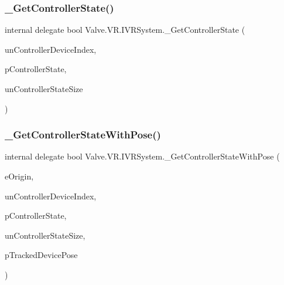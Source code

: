 \mbox{\label{struct_valve_1_1_v_r_1_1_i_v_r_system_a1eca77760e6464488c6ca3e083e0a456}} 
\subsubsection{\texorpdfstring{\_GetControllerState()}{\_GetControllerState()}}
{\footnotesize\ttfamily internal delegate bool Valve.\+V\+R.\+I\+V\+R\+System.\+\_\+\+Get\+Controller\+State (\begin{DoxyParamCaption}\item[{uint}]{un\+Controller\+Device\+Index,  }\item[{ref \mbox{\hyperlink{struct_valve_1_1_v_r_1_1_v_r_controller_state__t}{V\+R\+Controller\+State\+\_\+t}}}]{p\+Controller\+State,  }\item[{uint}]{un\+Controller\+State\+Size }\end{DoxyParamCaption})}

\mbox{\label{struct_valve_1_1_v_r_1_1_i_v_r_system_ad69cca720213c448e77167bb46b1a804}} 
\subsubsection{\texorpdfstring{\_GetControllerStateWithPose()}{\_GetControllerStateWithPose()}}
{\footnotesize\ttfamily internal delegate bool Valve.\+V\+R.\+I\+V\+R\+System.\+\_\+\+Get\+Controller\+State\+With\+Pose (\begin{DoxyParamCaption}\item[{\mbox{\hyperlink{namespace_valve_1_1_v_r_a29be99a3c2f780157bd490db06a7f12f}{E\+Tracking\+Universe\+Origin}}}]{e\+Origin,  }\item[{uint}]{un\+Controller\+Device\+Index,  }\item[{ref \mbox{\hyperlink{struct_valve_1_1_v_r_1_1_v_r_controller_state__t}{V\+R\+Controller\+State\+\_\+t}}}]{p\+Controller\+State,  }\item[{uint}]{un\+Controller\+State\+Size,  }\item[{ref \mbox{\hyperlink{struct_valve_1_1_v_r_1_1_tracked_device_pose__t}{Tracked\+Device\+Pose\+\_\+t}}}]{p\+Tracked\+Device\+Pose }\end{DoxyParamCaption})}


